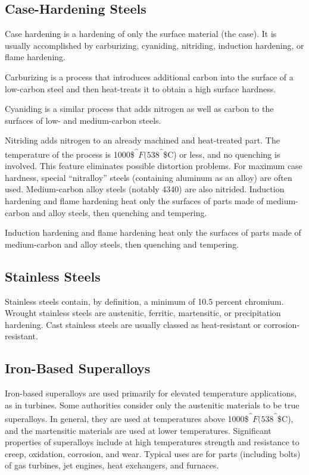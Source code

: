 \documentclass[a4paper,openany,12pt]{book}
\begin{document}
\subsection{Case-Hardening Steels}
\label{case-hardening-steels}
Case hardening is a hardening of only the surface material (the case).
It is usually accomplished by carburizing, cyaniding, nitriding,
induction hardening, or flame hardening.

Carburizing is a process that introduces additional carbon into the
surface of a low-carbon steel and then heat-treats it to obtain a high
surface hardness.

Cyaniding is a similar process that adds nitrogen as well as carbon to
the surfaces of low- and medium-carbon steels.

Nitriding adds nitrogen to an already machined and heat-treated part.
The temperature of the process is 1000\$\textsuperscript{\^{}}\(F (538\)\textsuperscript{\^{}}\$C) or
less, and no quenching is involved. This feature eliminates possible
distortion problems. For maximum case hardness, special ``nitralloy''
steels (containing aluminum as an alloy) are often used. Medium-carbon
alloy steels (notably 4340) are also nitrided. Induction hardening and
flame hardening heat only the surfaces of parts made of medium-carbon
and alloy steels, then quenching and tempering.

Induction hardening and flame hardening heat only the surfaces of parts
made of medium-carbon and alloy steels, then quenching and tempering.

\subsection{Stainless Steels}
\label{stainless-steels}
Stainless steels contain, by definition, a minimum of 10.5 percent
chromium. Wrought stainless steels are austenitic, ferritic,
martensitic, or precipitation hardening. Cast stainless steels are
usually classed as heat-resistant or corrosion-resistant.

\subsection{Iron-Based Superalloys}
\label{iron-based-superalloys}
Iron-based superalloys are used primarily for elevated temperature
applications, as in turbines. Some authorities consider only the
austenitic materials to be true superalloys. In general, they are used
at temperatures above 1000\$\textsuperscript{\^{}}\(F (538\)\textsuperscript{\^{}}\$C), and the
martensitic materials are used at lower temperatures. Significant
properties of superalloys include at high temperatures strength and
resistance to creep, oxidation, corrosion, and wear. Typical uses are
for parts (including bolts) of gas turbines, jet engines, heat
exchangers, and furnaces.
\end{document}
